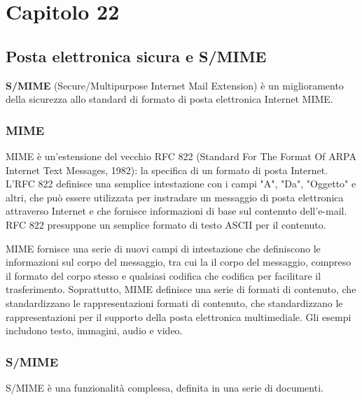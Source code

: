 \chapter{Capitolo 22}
\section{Posta elettronica sicura e S/MIME}
\textbf{S/MIME} (Secure/Multipurpose Internet Mail Extension) è un miglioramento della sicurezza allo standard di formato di posta elettronica Internet MIME.
\subsection{MIME}
MIME è un'estensione del vecchio RFC 822 (Standard For The Format Of ARPA Internet Text Messages, 1982): la specifica di un formato di posta Internet. L'RFC 822 definisce una semplice intestazione con i campi "A", "Da", "Oggetto" e altri, che può essere utilizzata per instradare un messaggio di posta elettronica attraverso Internet e che fornisce informazioni di base sul contenuto dell'e-mail. RFC 822 presuppone un semplice formato di testo ASCII per il contenuto. 

\singlespacing

MIME fornisce una serie di nuovi campi di intestazione che definiscono le informazioni sul corpo del messaggio, tra cui la il corpo del messaggio, compreso il formato del corpo stesso e qualsiasi codifica che codifica per facilitare il trasferimento. Soprattutto, MIME definisce una serie di formati di contenuto, che standardizzano le rappresentazioni formati di contenuto, che standardizzano le rappresentazioni per il supporto della posta elettronica multimediale. Gli esempi includono testo, immagini, audio e video.

\subsection{S/MIME}
S/MIME è una funzionalità complessa, definita in una serie di documenti. 

\singlespacing

